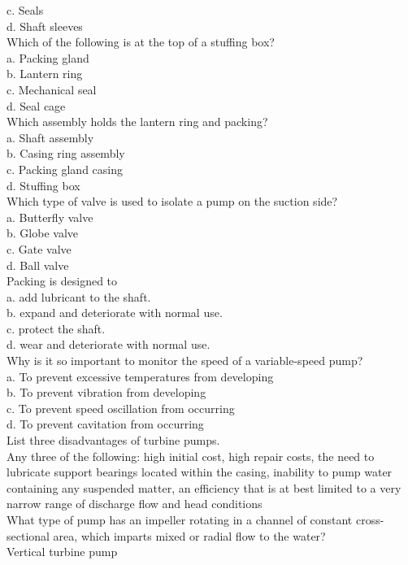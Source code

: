 c.	Seals\\
d.	Shaft sleeves\\
Which of the following is at the top of a stuffing box?\\
a.	Packing gland\\
b.	Lantern ring\\
c.	Mechanical seal\\
d.	Seal cage\\
Which assembly holds the lantern ring and packing?\\
a.	Shaft assembly\\
b.	Casing ring assembly\\
c.	Packing gland casing\\
d.	Stuffing box\\
Which type of valve is used to isolate a pump on the suction side?\\
a.	Butterfly valve\\
b.	Globe valve\\
c.	Gate valve\\
d.	Ball valve\\
Packing is designed to\\
a.	add lubricant to the shaft.\\
b.	expand and deteriorate with normal use.\\
c.	protect the shaft.\\
d.	wear and deteriorate with normal use.\\
Why is it so important to monitor the speed of a variable-speed pump?\\
a.	To prevent excessive temperatures from developing\\
b.	To prevent vibration from developing\\
c.	To prevent speed oscillation from occurring\\
d.	To prevent cavitation from occurring\\
List three disadvantages of turbine pumps.\\
Any three of the following: high initial cost, high repair costs, the need to lubricate support bearings located within the casing, inability to pump water containing any suspended matter, an efficiency that is at best limited to a very narrow range of discharge flow and head conditions\\
What type of pump has an impeller rotating in a channel of constant cross-sectional area, which imparts mixed or radial flow to the water?\\
Vertical turbine pump\\
